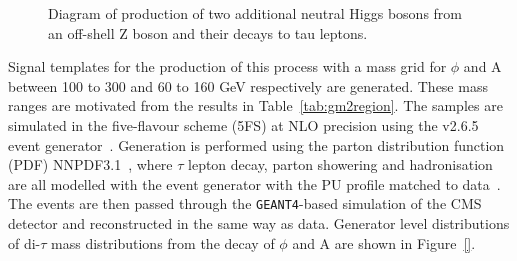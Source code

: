 \begin{figure}[H]
\centering
{}
\vspace*{10mm}
\caption{Diagram of production of two additional neutral Higgs bosons from an off-shell Z boson and their decays to tau leptons.}
\label{fig:4tau_feynamn}
\end{figure}

Signal templates for the production of this process with a mass grid for $\phi$ and A between 100 to 300 and 60 to 160 GeV respectively are generated.
These mass ranges are motivated from the results in Table~\ref{tab:gm2region}.
The samples are simulated in the five-flavour scheme (5FS) at NLO precision using the \MGvATNLO v2.6.5 event generator~\cite{Alwall:2011uj}.
Generation is performed using the parton distribution function (PDF) NNPDF3.1~\cite{Ball:2014uwa,Ball:2017nwa}, where $\tau$ lepton decay, parton showering and hadronisation are all modelled with the \PYTHIA event generator with the PU profile matched to data~\cite{Sirunyan:2019dfx,Sjostrand:2014zea}.
The events are then passed through the \texttt{GEANT4}-based \cite{Agostinelli:2002hh} simulation of the CMS detector and reconstructed in the same way as data.
Generator level distributions of di-$\tau$ mass distributions from the decay of $\phi$ and A are shown in Figure~\ref{}.\\

